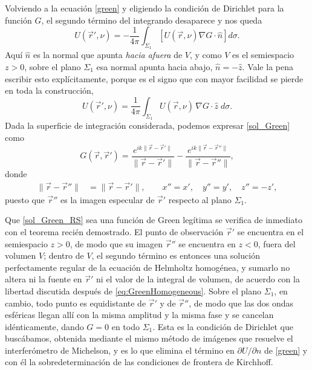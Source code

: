 		Volviendo a la ecuación \eqref{green} y eligiendo la condición de Dirichlet para la función $G$, el segundo término del integrando desaparece y nos queda
		\begin{equation}
			\label{psi_expr}
			U(\vec{r}', \nu) = -\frac{1}{4\pi} \int_{\Sigma_1} \left[U(\vec{r}, \nu) \nabla G \cdot\hat{n}\right] d\sigma .
		\end{equation}
		Aquí $\hat{n}$ es la normal que apunta \textit{hacia afuera} de $V$, y como $V$ es el semiespacio $z>0$, sobre el plano $\Sigma_{1}$ esa normal apunta hacia abajo, $\hat{n} = -\hat{z}$. Vale la pena escribir esto explícitamente, porque es el signo que con mayor facilidad se pierde en toda la construcción,
		\begin{equation}\label{eq:RSnormal}
			U(\vec{r}', \nu) = \frac{1}{4\pi} \int_{\Sigma_1} U(\vec{r}, \nu)\,\nabla G \cdot\hat{z}\; d\sigma .
		\end{equation}
		Dada la superficie de integración considerada, podemos expresar \eqref{sol_Green} como
		\begin{equation}
			\label{sol_Green_RS}
			G(\vec{r}, \vec{r}') = \frac{e^{ik\|\vec{r} - \vec{r}'\|}}{\|\vec{r} - \vec{r}'\|} - \frac{e^{ik\|\vec{r} - \vec{r}''\|}}{\|\vec{r} - \vec{r}''\|},
		\end{equation}
		\noindent donde
		\begin{align}
			\|\vec{r} - \vec{r}''\| &= \|\vec{r} - \vec{r}'\|, \qquad x'' = x', \quad y'' = y', \quad z'' = -z',
		\end{align}
		puesto que $\vec{r}''$ es la imagen especular de $\vec{r}'$ respecto al plano $\Sigma_1$.

		Que \eqref{sol_Green_RS} sea una función de Green legítima se verifica de inmediato con el teorema recién demostrado. El punto de observación $\vec{r}'$ se encuentra en el semiespacio $z>0$, de modo que su imagen $\vec{r}''$ se encuentra en $z<0$, fuera del volumen $V$; dentro de $V$, el segundo término es entonces una solución perfectamente regular de la ecuación de Helmholtz homogénea, y sumarlo no altera ni la fuente en $\vec{r}'$ ni el valor de la integral de volumen, de acuerdo con la libertad discutida después de \eqref{eq:GreenHomogeneous}. Sobre el plano $\Sigma_{1}$, en cambio, todo punto es equidistante de $\vec{r}'$ y de $\vec{r}''$, de modo que las dos ondas esféricas llegan allí con la misma amplitud y la misma fase y se cancelan idénticamente, dando $G = 0$ en todo $\Sigma_{1}$. Esta es la condición de Dirichlet que buscábamos, obtenida mediante el mismo método de imágenes que resuelve el interferómetro de Michelson, y es lo que elimina el término en $\partial U/\partial n$ de \eqref{green} y con él la sobredeterminación de las condiciones de frontera de Kirchhoff.

